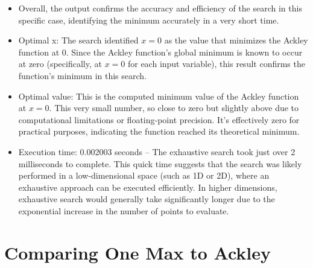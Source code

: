 \documentclass[
  letterpaper,
  DIV=11,
  numbers=noendperiod]{scrreprt}
\providecommand{\tightlist}{%
  \setlength{\itemsep}{0pt}\setlength{\parskip}{0pt}}\usepackage{longtable,booktabs,array}
\begin{document}
\begin{itemize}
\tightlist
\item
  Overall, the output confirms the accuracy and efficiency of the search
  in this specific case, identifying the minimum accurately in a very
  short time.
\item
  Optimal x: The search identified \(x=0\) as the value that minimizes
  the Ackley function at 0. Since the Ackley function's global minimum
  is known to occur at zero (specifically, at \(x=0\) for each input
  variable), this result confirms the function's minimum in this search.
\item
  Optimal value: This is the computed minimum value of the Ackley
  function at \(x=0\). This very small number, so close to zero but
  slightly above due to computational limitations or floating-point
  precision. It's effectively zero for practical purposes, indicating
  the function reached its theoretical minimum.
\item
  Execution time: 0.002003 seconds -- The exhaustive search took just
  over 2 milliseconds to complete. This quick time suggests that the
  search was likely performed in a low-dimensional space (such as 1D or
  2D), where an exhaustive approach can be executed efficiently. In
  higher dimensions, exhaustive search would generally take
  significantly longer due to the exponential increase in the number of
  points to evaluate.
\end{itemize}


\chapter{Comparing One Max to Ackley}\label{comparing-one-max-to-ackley}
\end{document}

